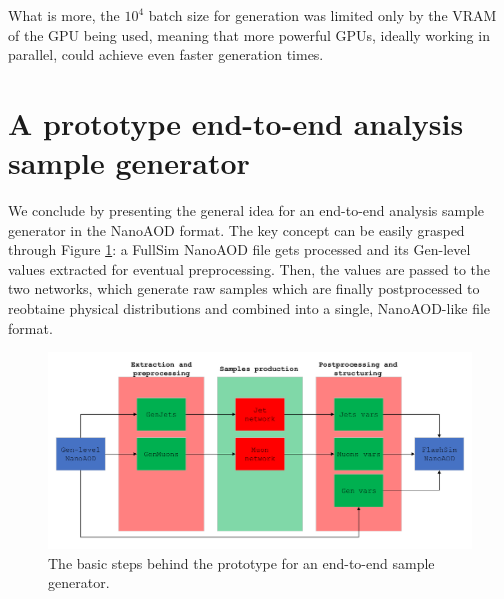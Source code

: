 What is more, the $10^{4}$ batch size for generation was limited only by the VRAM of the GPU being used, meaning that more powerful GPUs, ideally working in parallel, could achieve even faster generation times.


\section{A prototype end-to-end analysis sample generator}\label{sec:progen}

We conclude by presenting the general idea for an end-to-end analysis sample generator in the NanoAOD format. The key concept can be easily grasped through Figure \ref{fig:endtoend}: a FullSim NanoAOD file gets processed and its Gen-level values extracted for eventual preprocessing. Then, the values are passed to the two networks, which generate raw samples which are finally postprocessed to reobtaine physical distributions and combined into a single, NanoAOD-like file format.

\begin{figure}
    \centering
    \includegraphics[width=\linewidth]{gfx/ch5/endtoend.pdf}
    \caption[end-toend sample generator]{The basic steps behind the prototype for an end-to-end sample generator.}
    \label{fig:endtoend}
\end{figure}


